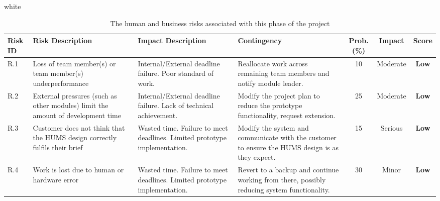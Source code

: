 \documentclass[10pt,a4paper]{article}
\newcommand{\tableformat}[4]{
\begin{table}[H]
\centering
  \rowcolors{2}{gray!10} {white}
\begin{tabular}{#1}
  \hline
  \rowcolor[gray]{0.9} #2
\end{tabular}
\caption{#3}
\label{#4}
\end{table}}
\begin{document}
\tableformat{p{0.8cm} p{3cm} p{3cm} p{3cm} c c c }
{ 	\hline
  	Risk ID & Risk Description & Impact Description & Contingency & Prob.(\%) & Impact & Score \\
  	\hline
  
 	R.1 & Loss of team member(s) or team member(s) underperformance & Internal/External deadline failure. Poor standard of work. & Reallocate work across remaining team members and notify module leader. & 10 & Moderate & \textbf{Low} \\
   	R.2 & External pressures (such as other modules) limit the amount of development time & Internal/External deadline failure. Lack of technical achievement. & Modify the project plan to reduce the prototype functionality, request extension. & 25 & Moderate &  \textbf{Low} \\
   	R.3 & Customer does not think that the HUMS design correctly fulfils their brief & Wasted time. Failure to meet deadlines. Limited prototype implementation. & Modify the system and communicate with the customer to ensure the HUMS design is as they expect. & 15 & Serious &  \textbf{Low} \\
	R.4 & Work is lost due to human or hardware error & Wasted time. Failure to meet deadlines. Limited prototype implementation. & Revert to a backup and continue working from there, possibly reducing system functionality. & 30 & Minor &  \textbf{Low} \\
  	\hline
}
{The human and business risks associated with this phase of the project}{tab:human_risks}
\end{document}

